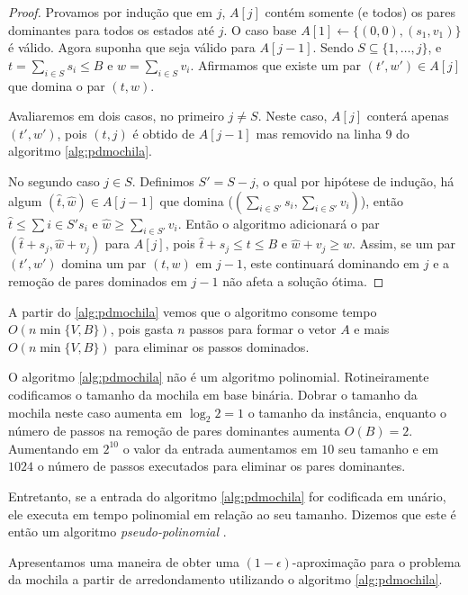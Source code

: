 \begin{proof}
Provamos por indução que em $j$, $A[j]$ contém somente (e todos) os pares dominantes para todos os estados até $j$. O caso base $A[1] \leftarrow \{(0,0),(s_1,v_1)\}$ é válido. Agora suponha que seja válido para $A[j-1]$. Sendo $S \subseteq \{1, \ldots, j\}$, e $t=\sum_{i \in S} s_i \leq B$ e $w = \sum_{i \in S} v_i$. Afirmamos que existe um par $(t',w') \in A[j]$ que domina o par $(t,w)$.

Avaliaremos em dois casos, no primeiro $j \neq S$. Neste caso, $A[j]$ conterá apenas $(t',w')$, pois $(t,j)$ é obtido de $A[j-1]$ mas removido na linha 9 do algoritmo \ref{alg:pdmochila}.

No segundo caso $j \in S$. Definimos $S' = S - {j}$, o qual por hipótese de indução, há algum $(\hat{t},\hat{w}) \in A[j-1]$ que domina ($\left(\sum_{i \in S'} s_i,\sum_{i \in S'} v_i\right)$), então $\hat{t} \leq \sum{i \in S'} s_i$ e $\hat{w} \geq \sum_{i \in S'} v_i$. Então o algoritmo adicionará o par $\left(\hat{t} + s_j, \hat{w} + v_j \right)$ para $A[j]$, pois $\hat{t} + s_j \leq t \leq B$ e $\hat{w} + v_j \geq w$. Assim, se um par $(t',w')$ domina um par $(t,w)$ em $j-1$, este continuará dominando em $j$ e a remoção de pares dominados em $j-1$ não afeta a solução ótima.

\end{proof}

A partir do \ref{alg:pdmochila} vemos que o algoritmo consome tempo $O(n \min\{V,B\})$, pois gasta $n$ passos para formar o vetor $A$ e mais $O(n \min\{V,B\})$ para eliminar os passos dominados.

O algoritmo \ref{alg:pdmochila} não é um algoritmo polinomial. Rotineiramente codificamos o tamanho da mochila em base binária. Dobrar o tamanho da mochila neste caso aumenta em $\log_2 2 = 1$ o tamanho da instância, enquanto o número de passos na remoção de pares dominantes aumenta $O(B) = 2$. Aumentando em $2^{10}$ o valor da entrada aumentamos em $10$ seu tamanho e em $1024$ o número de passos executados para eliminar os pares dominantes.

Entretanto, se a entrada do algoritmo \ref{alg:pdmochila} for codificada em unário, ele executa em tempo polinomial em relação ao seu tamanho. Dizemos que este é então um algoritmo \textit{pseudo-polinomial} \cite{Williamson}.

Apresentamos uma maneira de obter uma $(1 - \epsilon)$-aproximação para o problema da mochila a partir de arredondamento utilizando o algoritmo \ref{alg:pdmochila}.

